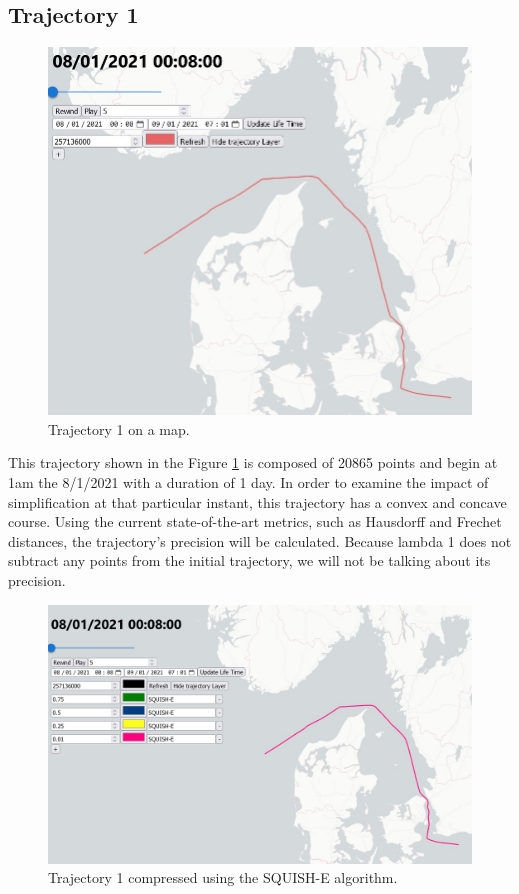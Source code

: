 \subsection{Trajectory 1}

\begin{figure}[!ht]
    \centering
    \includegraphics[width=1\linewidth]{figures/Stats/traj_1.jpg}
    \caption{Trajectory 1 on a map.}
    \label{fig:traj_1}
\end{figure}

This trajectory shown in the Figure \ref{fig:traj_1} is composed of 20865 points and begin at 1am the 8/1/2021 with a duration of 1 day. In order to examine the impact of simplification at that particular instant, this trajectory has a convex and concave course. Using the current state-of-the-art metrics, such as Hausdorff and Frechet distances, the trajectory's precision will be calculated. Because lambda 1 does not subtract any points from the initial trajectory, we will not be talking about its precision.



\begin{figure}[!ht]
    \centering
    \includegraphics[width=0.6\linewidth]{figures/Stats/squish_1.jpg}
    \caption{Trajectory 1 compressed using the SQUISH-E algorithm.}
    \label{fig:traj_1_squish}
\end{figure}

